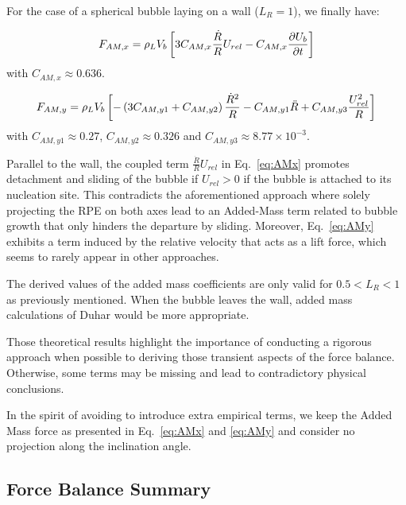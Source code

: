 For the case of a spherical bubble laying on a wall ($L_{R}=1$), we finally have:



\begin{align}
F_{AM,x}=\rho_{L}V_{b}\left[ 3C_{AM,x}\frac{\dot{R}}{R}U_{rel} - C_{AM,x}\frac{\partial{U_{b}}}{\partial t} \right]
\label{eq:AMx}
\end{align}
with $C_{AM,x} \approx 0.636$.


\begin{align}
F_{AM,y}=\rho_{L}V_{b}\left[ -\left( 3 C_{AM,y1} + C_{AM,y2} \right)\frac{\dot{R}^{2}}{R}-C_{AM,y1}\ddot{R} + C_{AM,y3}\frac{U_{rel}^{2}}{R} \right]
\label{eq:AMy}
\end{align}
with $C_{AM,y1} \approx 0.27$, $C_{AM,y2}\approx 0.326$ and $C_{AM,y3}\approx 8.77\times  10^{-3}$.


\npar

Parallel to the wall, the coupled term $\frac{\dot{R}}{R}U_{rel}$ in Eq.~\ref{eq:AMx} promotes detachment and sliding of the bubble if $U_{rel}>0$ \eg if the bubble is attached to its nucleation site. This contradicts the aforementioned approach where solely projecting the RPE on both axes lead to an Added-Mass term related to bubble growth that only hinders the departure by sliding. Moreover, Eq.~\ref{eq:AMy} exhibits a term induced by the relative velocity that acts as a lift force, which seems to rarely appear in other approaches.

\begin{remark*}{}
The derived values of the added mass coefficients are only valid for $0.5 < L_{R} < 1$ as previously mentioned. When the bubble leaves the wall, added mass calculations of Duhar \cite{duhar_croissance_2003} would be more appropriate.
\end{remark*}



\npar
Those theoretical results highlight the importance of conducting a rigorous approach when possible to deriving those transient aspects of the force balance. Otherwise, some terms may be missing and lead to contradictory physical conclusions. 

In the spirit of avoiding to introduce extra empirical terms, we keep the Added Mass force as presented in Eq.~\ref{eq:AMx} and \ref{eq:AMy} and consider no projection along the inclination angle.



\subsection{Force Balance Summary}\label{subsec:BdF}


